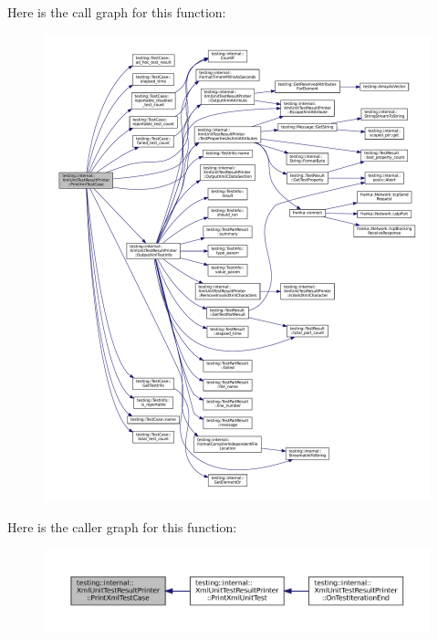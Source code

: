 Here is the call graph for this function\+:
\nopagebreak
\begin{figure}[H]
\begin{center}
\leavevmode
\includegraphics[width=350pt]{classtesting_1_1internal_1_1XmlUnitTestResultPrinter_a7f7accabeac896d4271f36d24ca02dba_cgraph}
\end{center}
\end{figure}
Here is the caller graph for this function\+:
\nopagebreak
\begin{figure}[H]
\begin{center}
\leavevmode
\includegraphics[width=350pt]{classtesting_1_1internal_1_1XmlUnitTestResultPrinter_a7f7accabeac896d4271f36d24ca02dba_icgraph}
\end{center}
\end{figure}
\mbox{\label{classtesting_1_1internal_1_1XmlUnitTestResultPrinter_a3be1c8766241d0f34cdf59b45a52f73b}} 
